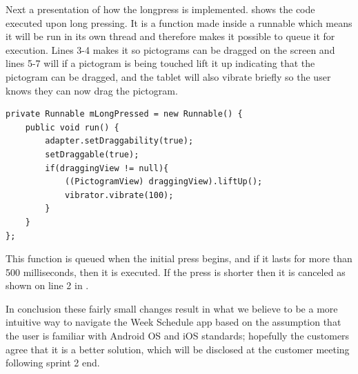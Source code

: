 Next a presentation of how the longpress is implemented.
 shows the code executed upon long pressing.
It is a function made inside a runnable which means it will be run in its own thread and therefore makes it possible to queue it for execution.
Lines 3-4 makes it so pictograms can be dragged on the screen and lines 5-7 will if a pictogram is being touched lift it up indicating that the pictogram can be dragged, and the tablet will also vibrate briefly so the user knows they can now drag the pictogram.

\begin{lstlisting}[floatplacement=h, caption={The longpress function which is queued upon a \texttt{MotionEvent\_Down}, i.e. a touch.}, label={lst:longpress}]
private Runnable mLongPressed = new Runnable() {
    public void run() {
        adapter.setDraggability(true);
        setDraggable(true);
        if(draggingView != null){
            ((PictogramView) draggingView).liftUp();
            vibrator.vibrate(100);
        }
    }
};
\end{lstlisting}
This function is queued when the initial press begins, and if it lasts for more than 500 milliseconds, then it is executed.
If the press is shorter then it is canceled as shown on line 2 in .

\bigskip \noindent
In conclusion these fairly small changes result in what we believe to be a more intuitive way to navigate the Week Schedule app based on the assumption that the user is familiar with Android OS and iOS standards; hopefully the customers agree that it is a better solution, which will be disclosed at the customer meeting following sprint 2 end.
